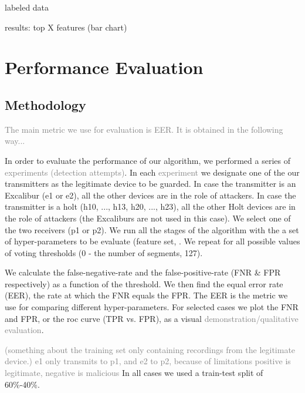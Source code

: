 \documentclass[conference]{IEEEtran}
\begin{document}
 \cite{benjamini1995controlling}
 
  labeled data
 
  results: top X features  (bar chart)

\section{Performance Evaluation}

\subsection{Methodology}
  \textcolor{gray}{The main metric we use for evaluation is EER. It is obtained in the following way...}
  
  In order to evaluate the performance of our algorithm, we performed a series of \textcolor{gray}{experiments (detection attempts)}. In each \textcolor{gray}{experiment} we designate one of the our transmitters as the legitimate device to be guarded. In case the transmitter is an Excalibur (e1 or e2), all the other devices are in the role of attackers. In case the transmitter is a holt (h10, ..., h13, h20, ..., h23), all the other Holt devices are in the role of attackers (the Excaliburs are not used in this case). We select one of the two receivers (p1 or p2). We run all the stages of the algorithm with the a set of hyper-parameters to be evaluate (feature set, . We repeat for all possible values of voting thresholds (0 - the number of segments, 127).
  
  We calculate the false-negative-rate and the false-positive-rate (FNR \& FPR respectively) as a function of the threshold. We then find the equal error rate (EER), the rate at which the FNR equals the FPR. The EER is the metric we use for comparing different hyper-parameters.
  For selected cases we plot the FNR and FPR, or the roc curve (TPR vs. FPR), as a visual \textcolor{gray}{demonstration/qualitative evaluation}.
  
  \textcolor{gray}{(something about the training set only containing recordings from the legitimate device.)}
  \textcolor{gray}{e1 only transmits to p1, and e2 to p2, because of limitations}
  \textcolor{gray}{positive is legitimate, negative is malicious}
  In all cases we used a train-test split of 60\%-40\%.
  
\end{document}
